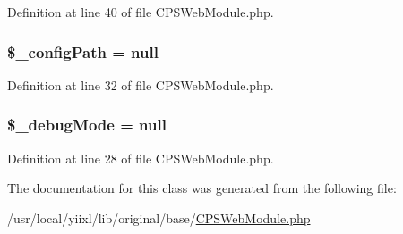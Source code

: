 Definition at line 40 of file CPSWebModule.php.

\hypertarget{classCPSWebModule_a05a571c47e275207658ec3ff2a228291}{
\subsubsection[{\$\_\-configPath}]{\setlength{\rightskip}{0pt plus 5cm}\$\_\-configPath = null}}
\label{classCPSWebModule_a05a571c47e275207658ec3ff2a228291}


Definition at line 32 of file CPSWebModule.php.

\hypertarget{classCPSWebModule_a1768a9df40beec6e4b8c6d853396bb81}{
\subsubsection[{\$\_\-debugMode}]{\setlength{\rightskip}{0pt plus 5cm}\$\_\-debugMode = null}}
\label{classCPSWebModule_a1768a9df40beec6e4b8c6d853396bb81}


Definition at line 28 of file CPSWebModule.php.



The documentation for this class was generated from the following file:\begin{DoxyCompactItemize}
\item 
/usr/local/yiixl/lib/original/base/\hyperlink{CPSWebModule_8php}{CPSWebModule.php}\end{DoxyCompactItemize}
